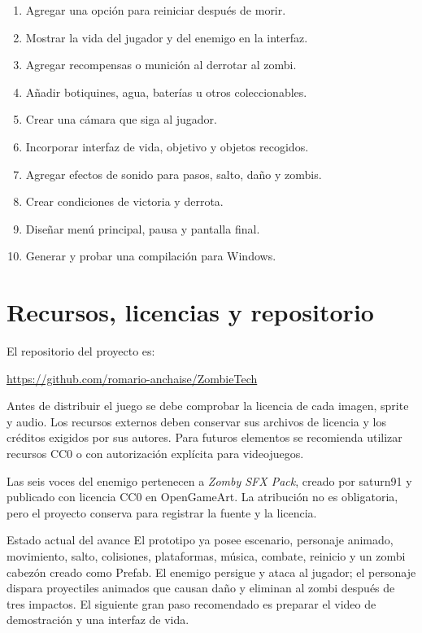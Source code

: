 \documentclass[11pt,a4paper]{article}
\begin{document}
\begin{enumerate}
  \item Agregar una opción para reiniciar después de morir.
  \item Mostrar la vida del jugador y del enemigo en la interfaz.
  \item Agregar recompensas o munición al derrotar al zombi.
  \item Añadir botiquines, agua, baterías u otros coleccionables.
  \item Crear una cámara que siga al jugador.
  \item Incorporar interfaz de vida, objetivo y objetos recogidos.
  \item Agregar efectos de sonido para pasos, salto, daño y zombis.
  \item Crear condiciones de victoria y derrota.
  \item Diseñar menú principal, pausa y pantalla final.
  \item Generar y probar una compilación para Windows.
\end{enumerate}

\section{Recursos, licencias y repositorio}

El repositorio del proyecto es:

\begin{center}
\url{https://github.com/romario-anchaise/ZombieTech}
\end{center}

Antes de distribuir el juego se debe comprobar la licencia de cada imagen, sprite y audio. Los recursos externos deben conservar sus archivos de licencia y los créditos exigidos por sus autores. Para futuros elementos se recomienda utilizar recursos CC0 o con autorización explícita para videojuegos.

Las seis voces del enemigo pertenecen a \textit{Zomby SFX Pack}, creado por saturn91 y publicado con licencia CC0 en OpenGameArt. La atribución no es obligatoria, pero el proyecto conserva  para registrar la fuente y la licencia.

\begin{gamebox}{Estado actual del avance}
El prototipo ya posee escenario, personaje animado, movimiento, salto, colisiones, plataformas, música, combate, reinicio y un zombi cabezón creado como Prefab. El enemigo persigue y ataca al jugador; el personaje dispara proyectiles animados que causan daño y eliminan al zombi después de tres impactos. El siguiente gran paso recomendado es preparar el video de demostración y una interfaz de vida.
\end{gamebox}
\end{document}
